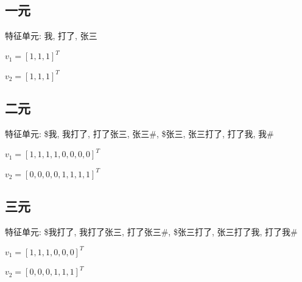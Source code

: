 \documentclass[../main.tex]{subfiles}
\begin{document}
\subsection*{一元}

特征单元: 我, 打了, 张三

$v_1 = [1,1,1]^T$

$v_2 = [1,1,1]^T$

\subsection*{二元}

特征单元: \$我, 我打了, 打了张三, 张三\#,
\$张三, 张三打了, 打了我, 我\#

$v_1 = [1,1,1,1,0,0,0,0]^T$

$v_2 = [0,0,0,0,1,1,1,1]^T$

\subsection*{三元}

特征单元: \$我打了, 我打了张三, 打了张三\#,
\$张三打了, 张三打了我, 打了我\#

$v_1 = [1,1,1,0,0,0]^T$

$v_2 = [0,0,0,1,1,1]^T$
\end{document}
